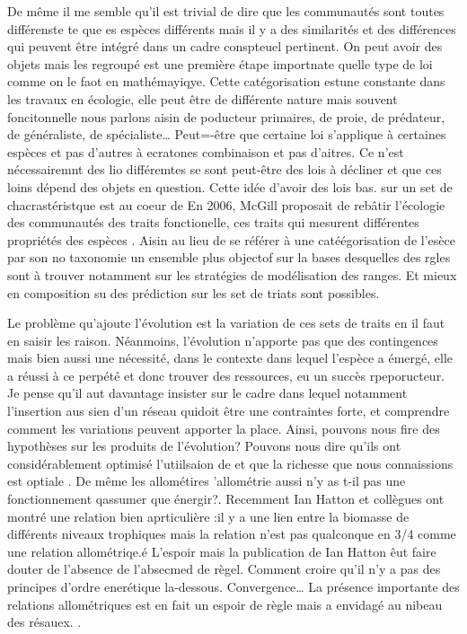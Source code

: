 De même il me semble qu'il est trivial de dire que les communautés sont
toutes différenste te que es espèces différents mais il y a des
similarités et des différences qui peuvent être intégré dans un cadre
conspteuel pertinent. On peut avoir des objets mais les regroupé est une
première étape importnate quelle type de loi comme on le faot en
mathémayiqye. Cette catégorisation estune constante dans les travaux en
écologie, elle peut être de différente nature mais souvent foncitonnelle
nous parlons aisin de poducteur primaires, de proie, de prédateur, de
généraliste, de spécialiste\ldots{} Peut=-être que certaine loi
s'applique à certaines espèces et pas d'autres à ecratones combinaison
et pas d'aitres. Ce n'est nécessairemnt des lio différemtes se sont
peut-être des lois à décliner et que ces loins dépend des objets en
question. Cette idée d'avoir des lois bas. sur un set de
chacrastéristque est au coeur de En 2006, McGill proposait de rebâtir
l'écologie des communautés des traits fonctionelle, ces traits qui
mesurent différentes propriétés des espèces \citep{McGill2006}. Aisin au
lieu de se référer à une catéégorisation de l'esèce par son no taxonomie
un ensemble plus objectof sur la bases desquelles des rgles sont à
trouver notamment sur les stratégies de modélisation des ranges. Et
mieux en composition su des prédiction sur les set de triats sont
possibles.

Le problème qu'ajoute l'évolution est la variation de ces sets de traits
en il faut en saisir les raison. Néanmoins, l'évolution n'apporte pas
que des contingences mais bien aussi une nécessité, dans le contexte
dans lequel l'espèce a émergé, elle a réussi à ce perpété et donc
trouver des ressources, eu un succès rpeporucteur. Je pense qu'il aut
davantage insister sur le cadre dans lequel notamment l'insertion aus
sien d'un réseau quidoit être une contraintes forte, et comprendre
comment les variations peuvent apporter la place. Ainsi, pouvons nous
fire des hypothèses sur les produits de l'évolution? Pouvons nous dire
qu'ils ont considérablement optimisé l'utiilsaion de et que la richesse
que nous connaissions est optiale \citep{Rabosky2015}. De même les
allométires 'allométrie aussi \citep{Schneider2012} n'y as t-il pas une
fonctionnement qassumer que énergir?. Recemment Ian Hatton et collègues
ont montré une relation bien aprticulière :il y a une lien entre la
biomasse de différents niveaux trophiques mais la relation n'est pas
qualconque en 3/4 comme une relation allométriqe.é L'espoir mais la
publication de Ian Hatton êut faire douter de l'absence de l'absecmed de
règel. Comment croire qu'il n'y a pas des principes d'ordre enerétique
la-dessous. Convergence\ldots{} La présence importante des relations
allométriques est en fait un espoir de règle mais a envidagé au nibeau
des résauex. \citep{Hatton2015}.

